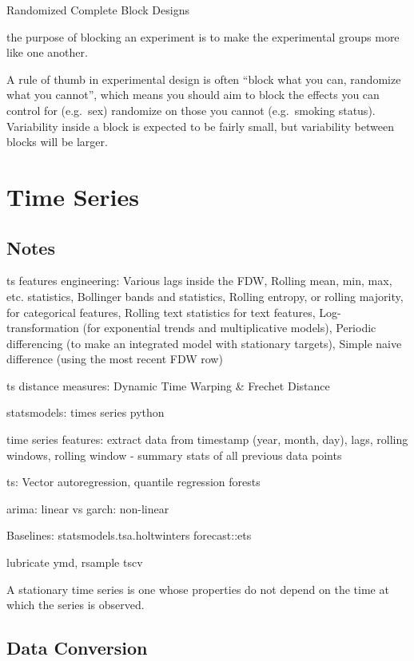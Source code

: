 \documentclass[]{book}
\begin{document}
Randomized Complete Block Designs

the purpose of blocking an experiment is to make the experimental groups
more like one another.

A rule of thumb in experimental design is often ``block what you can,
randomize what you cannot'', which means you should aim to block the
effects you can control for (e.g.~sex) randomize on those you cannot
(e.g.~smoking status). Variability inside a block is expected to be
fairly small, but variability between blocks will be larger.

\chapter{Time Series}\label{time-series}

\section{Notes}\label{notes}

ts features engineering: Various lags inside the FDW, Rolling mean, min,
max, etc. statistics, Bollinger bands and statistics, Rolling entropy,
or rolling majority, for categorical features, Rolling text statistics
for text features, Log-transformation (for exponential trends and
multiplicative models), Periodic differencing (to make an integrated
model with stationary targets), Simple naive difference (using the most
recent FDW row)

ts distance measures: Dynamic Time Warping \& Frechet Distance

statsmodels: times series python

time series features: extract data from timestamp (year, month, day),
lags, rolling windows, rolling window - summary stats of all previous
data points

ts: Vector autoregression, quantile regression forests

arima: linear vs garch: non-linear

Baselines: statsmodels.tsa.holtwinters \textbar{} forecast::ets

lubricate ymd, rsample tscv

A stationary time series is one whose properties do not depend on the
time at which the series is observed.

\section{Data Conversion}\label{data-conversion}
\end{document}
